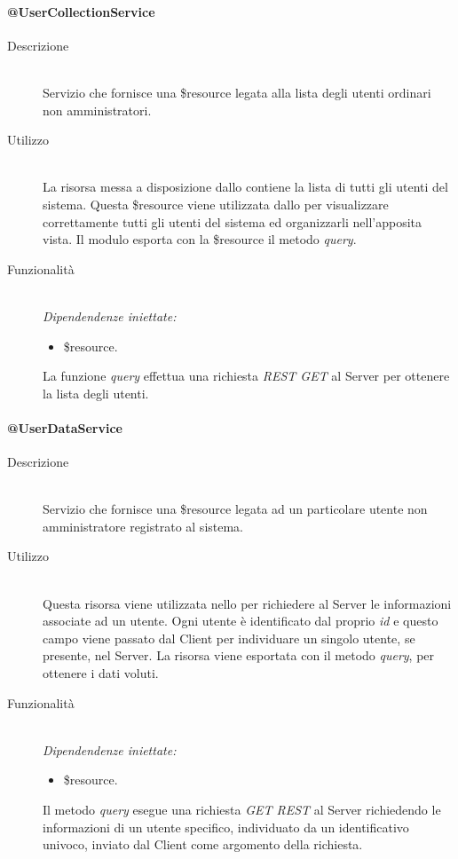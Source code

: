 \paragraph{@UserCollectionService}
\begin{description}
 \item[Descrizione] \hfill \\
 Servizio che fornisce una \$resource legata alla lista degli utenti ordinari non amministratori.  
 \item[Utilizzo] \hfill \\
 La risorsa messa a disposizione dallo  contiene la lista di tutti gli utenti 
 del sistema. Questa \$resource viene utilizzata dallo  per visualizzare 
 correttamente tutti gli utenti del sistema ed organizzarli nell'apposita vista. Il modulo esporta 
 con la \$resource il metodo \textit{query}. 
 \item[Funzionalità] \hfill \\
 \emph{Dipendendenze iniettate:}
 \begin{itemize}
  \item \$resource.
 \end{itemize}
 La funzione \textit{query} effettua una richiesta \textit{REST GET} al Server per ottenere la lista degli 
 utenti.
\end{description}

\paragraph{@UserDataService}
\begin{description}
 \item[Descrizione] \hfill \\
 Servizio che fornisce una \$resource legata ad un particolare utente non amministratore registrato al sistema.
 \item[Utilizzo] \hfill \\
 Questa risorsa viene utilizzata nello  per richiedere al Server le informazioni associate ad un utente. Ogni utente è identificato dal proprio \textit{id} e questo campo viene passato dal Client per individuare un singolo utente, se presente, nel Server. La risorsa viene esportata 
con il metodo \textit{query}, per ottenere i dati voluti.
 \item[Funzionalità] \hfill \\
 \emph{Dipendendenze iniettate:}
 \begin{itemize}
  \item \$resource.
 \end{itemize}
 Il metodo \textit{query} esegue una richiesta \textit{GET REST} al Server richiedendo le informazioni di un utente specifico, individuato da un identificativo univoco, inviato dal Client come argomento della richiesta.
\end{description}

